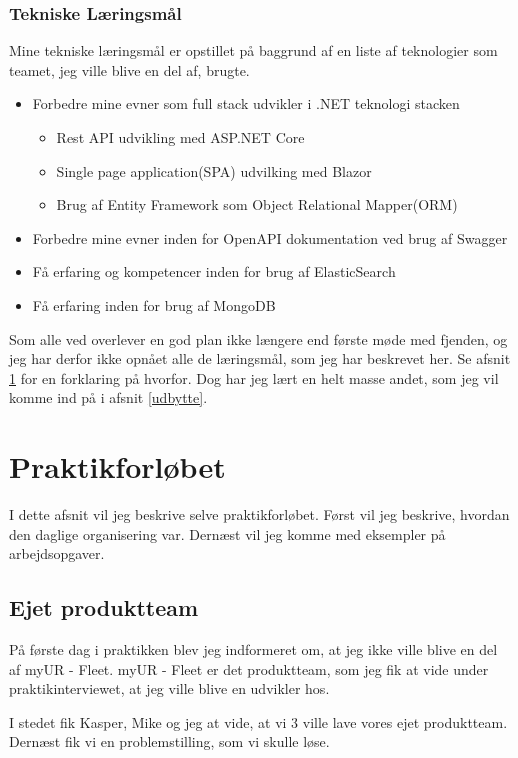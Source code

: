 \documentclass[a4paper]{article}
\begin{document}
\subsubsection*{Tekniske Læringsmål}
Mine tekniske læringsmål er opstillet på baggrund af en liste af teknologier
som teamet, jeg ville blive en del af, brugte.

\begin{itemize}
    \item Forbedre mine evner som full stack udvikler i .NET teknologi stacken
    \begin{itemize}
        \item Rest API udvikling med ASP.NET Core
        \item Single page application(SPA) udvilking med Blazor
        \item Brug af Entity Framework som Object Relational Mapper(ORM)
    \end{itemize}
    \item Forbedre mine evner inden for OpenAPI dokumentation ved brug af
    Swagger
    \item Få erfaring og kompetencer inden for brug af ElasticSearch
    \item Få erfaring inden for brug af MongoDB
\end{itemize}

Som alle ved overlever en god plan ikke længere end første møde med fjenden,
og jeg har derfor ikke opnået alle de læringsmål, som jeg har beskrevet her.
Se afsnit \ref{praktikforloeb} for en forklaring på hvorfor.
Dog har jeg lært en helt masse andet, 
som jeg vil komme ind på i afsnit \ref{udbytte}.

\section{Praktikforløbet}
\label{praktikforloeb}
I dette afsnit vil jeg beskrive selve praktikforløbet.
Først vil jeg beskrive, hvordan den daglige organisering var.
Dernæst vil jeg komme med eksempler på arbejdsopgaver.

\subsection{Ejet produktteam}
På første dag i praktikken blev jeg indformeret om,
at jeg ikke ville blive en del af myUR - Fleet.
myUR - Fleet er det produktteam, som jeg fik at vide under praktikinterviewet,
at jeg ville blive en udvikler hos.

I stedet fik Kasper, Mike og jeg at vide,
at vi 3 ville lave vores ejet produktteam.
Dernæst fik vi en problemstilling, som vi skulle løse.
\end{document}

